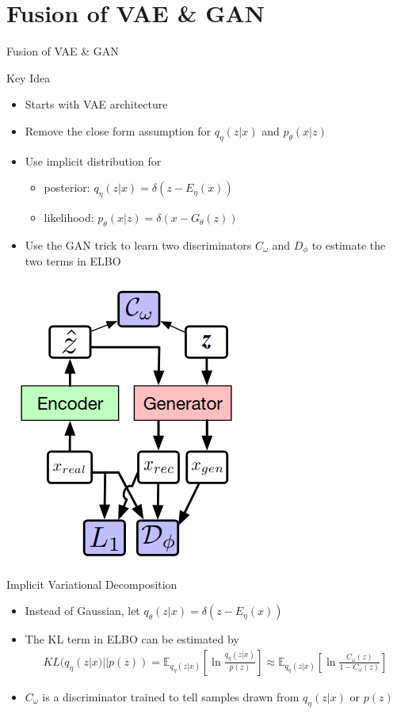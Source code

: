 \documentclass[compress]{beamer}
\newcommand{\expects}[2]{\mathbb{E}_{#1} \left[ #2 \right]}
\begin{document}
\section{Fusion of VAE \& GAN}
\begin{frame}[t]{Fusion of VAE \& GAN}
    \begin{block}{Key Idea}
        \begin{itemize}
            \item Starts with VAE architecture
            \item Remove the close form assumption for $q_{\eta}(z|x)$ and $p_{\theta}(x|z)$ 
            \item Use implicit distribution for 
                \begin{itemize}
                    \item posterior: $q_{\eta}(z|x)=\delta(z-E_{\eta}(x))$
                    \item likelihood: $p_{\theta}(x|z)=\delta(x-G_{\theta}(z))$
                \end{itemize}
            \item Use the GAN trick to learn two discriminators $C_{\omega}$ and $D_{\phi}$ to estimate the two terms in ELBO
        \end{itemize}
    \end{block}
    \includegraphics[scale=.3]{alphagan}
\end{frame}

\begin{frame}[t]{Implicit Variational Decomposition}
    \begin{itemize}
        \item Instead of Gaussian, let $q_{\theta}(z|x)=\delta(z-E_{\eta}(x))$ 
        \item The KL term in ELBO can be estimated by
            \begin{align*}
                KL(q_{\eta}(z|x)||p(z)) = \expects{q_{\eta}(z|x)}{\ln \frac{q_{\eta}(z|x)}{p(z)} } \approx \expects{q_{\eta}(z|x)}{\ln \frac{C_{\omega}(z)}{1-C_\omega(z)} }
            \end{align*}
        \item $C_{\omega}$ is a discriminator trained to tell samples drawn from $q_{\eta}(z|x)$ or $p(z)$
    \end{itemize}
\end{frame}
\end{document}
